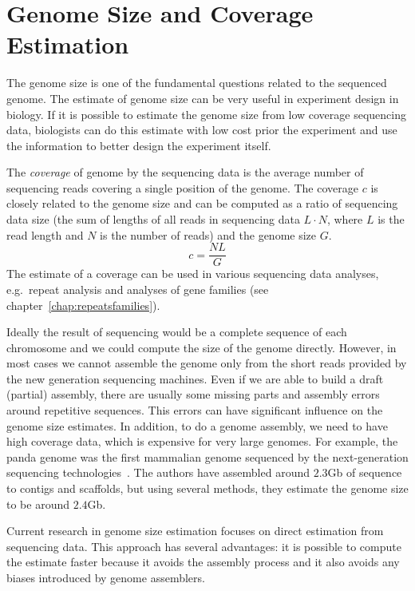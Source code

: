 \chapter[Genome Size and Coverage]{Genome Size and Coverage Estimation}
\label{chap:genomesize}

The genome size is one of the fundamental questions related to the sequenced genome.
The estimate of genome size can be very useful in experiment design in biology. If it is possible to estimate the genome size from low coverage sequencing data, biologists can do this estimate with low cost prior the experiment and use the information to better design the experiment itself.

The \emph{coverage} of genome by the sequencing data is the average number of sequencing reads covering a single position of the genome. The coverage $c$ is closely related to the genome size and can be computed as a ratio of sequencing data size (the sum of lengths of all reads in sequencing data $L\cdot N$, where $L$ is the read length and $N$ is the number of reads) and the genome size $G$.
$$c = \frac{NL}{G}$$
The estimate of a coverage can be used in various sequencing data analyses, e.g.\ repeat analysis and analyses of gene families (see chapter~\ref{chap:repeatsfamilies}). 

Ideally the result of sequencing would be a complete sequence of each chromosome and we could compute the size of the genome directly.
However, in most cases we cannot assemble the genome only from the short reads provided by the new generation sequencing machines.
Even if we are able to build a draft (partial) assembly, there are usually some missing parts and assembly errors around repetitive sequences. This errors can have significant influence on the genome size estimates. In addition, to do a genome assembly, we need to have high coverage data, which is expensive for very large genomes. For example, the panda genome was the first mammalian genome sequenced
by the next-generation sequencing technologies~\cite{li2010panda}. The authors have assembled around $2.3$Gb of sequence to contigs and scaffolds, but using
several methods, they estimate the genome size to be around $2.4$Gb.

Current research in genome size estimation focuses on direct estimation from sequencing data. This approach has several advantages: it is possible to compute the estimate faster because it avoids the assembly process and it also avoids any biases introduced by genome assemblers.

